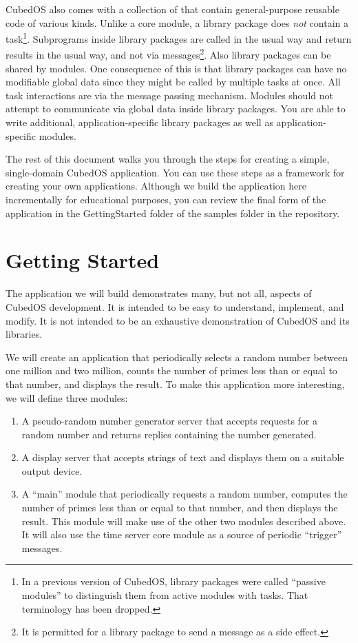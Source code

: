 \documentclass{scrreprt}
\begin{document}
CubedOS also comes with a collection of  that contain general-purpose
reusable code of various kinds. Unlike a core module, a library package does \emph{not} contain
a task\footnote{In a previous version of CubedOS, library packages were called ``passive
  modules'' to distinguish them from active modules with tasks. That terminology has been
  dropped.}. Subprograms inside library packages are called in the usual way and return results
in the usual way, and not via messages\footnote{It is permitted for a library package to send a
  message as a side effect.}. Also library packages can be shared by modules. One consequence of
this is that library packages can have no modifiable global data since they might be called by
multiple tasks at once. All task interactions are via the message passing mechanism. Modules
should not attempt to communicate via global data inside library packages. You are able to write
additional, application-specific library packages as well as application-specific modules.

The rest of this document walks you through the steps for creating a simple, single-domain
CubedOS application. You can use these steps as a framework for creating your own applications.
Although we build the application here incrementally for educational purposes, you can review
the final form of the application in the GettingStarted folder of the samples folder in the
repository.

\chapter{Getting Started}

The application we will build demonstrates many, but not all, aspects of CubedOS development. It
is intended to be easy to understand, implement, and modify. It is not intended to be an
exhaustive demonstration of CubedOS and its libraries.

We will create an application that periodically selects a random number between one million and
two million, counts the number of primes less than or equal to that number, and displays the
result. To make this application more interesting, we will define three modules:
\begin{enumerate}
\item A pseudo-random number generator server that accepts requests for a random number and
  returns replies containing the number generated.
\item A display server that accepts strings of text and displays them on a suitable output
  device.
\item A ``main'' module that periodically requests a random number, computes the number of
  primes less than or equal to that number, and then displays the result. This module will make
  use of the other two modules described above. It will also use the time server core module as
  a source of periodic ``trigger'' messages.
\end{enumerate}
\end{document}
